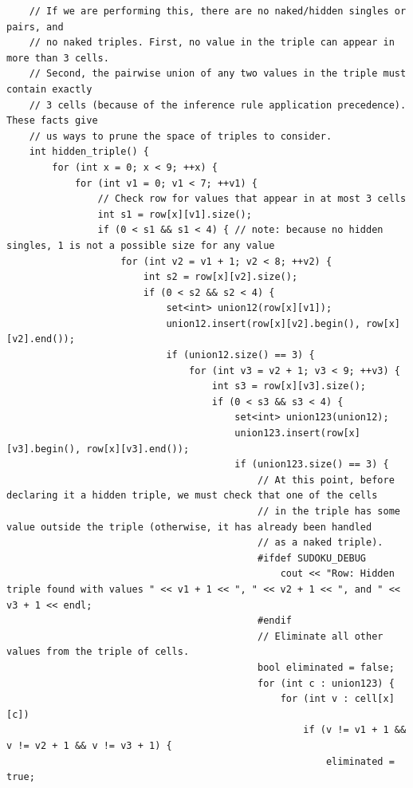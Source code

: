 \documentclass{article}
\begin{document}
\begin{lstlisting}
    // If we are performing this, there are no naked/hidden singles or pairs, and
    // no naked triples. First, no value in the triple can appear in more than 3 cells.
    // Second, the pairwise union of any two values in the triple must contain exactly
    // 3 cells (because of the inference rule application precedence). These facts give
    // us ways to prune the space of triples to consider.
    int hidden_triple() {
        for (int x = 0; x < 9; ++x) {
            for (int v1 = 0; v1 < 7; ++v1) {
                // Check row for values that appear in at most 3 cells
                int s1 = row[x][v1].size();
                if (0 < s1 && s1 < 4) { // note: because no hidden singles, 1 is not a possible size for any value
                    for (int v2 = v1 + 1; v2 < 8; ++v2) {
                        int s2 = row[x][v2].size();
                        if (0 < s2 && s2 < 4) {
                            set<int> union12(row[x][v1]);
                            union12.insert(row[x][v2].begin(), row[x][v2].end());
                            if (union12.size() == 3) {
                                for (int v3 = v2 + 1; v3 < 9; ++v3) {
                                    int s3 = row[x][v3].size();
                                    if (0 < s3 && s3 < 4) {
                                        set<int> union123(union12);
                                        union123.insert(row[x][v3].begin(), row[x][v3].end());
                                        if (union123.size() == 3) {
                                            // At this point, before declaring it a hidden triple, we must check that one of the cells
                                            // in the triple has some value outside the triple (otherwise, it has already been handled
                                            // as a naked triple).
                                            #ifdef SUDOKU_DEBUG
                                                cout << "Row: Hidden triple found with values " << v1 + 1 << ", " << v2 + 1 << ", and " << v3 + 1 << endl;
                                            #endif
                                            // Eliminate all other values from the triple of cells.
                                            bool eliminated = false;
                                            for (int c : union123) {
                                                for (int v : cell[x][c])
                                                    if (v != v1 + 1 && v != v2 + 1 && v != v3 + 1) {
                                                        eliminated = true;

\end{lstlisting}
\end{document}
